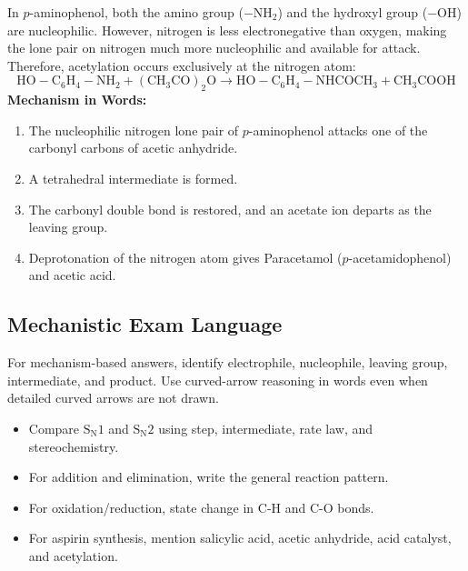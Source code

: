 \documentclass[12pt,a4paper]{article}
\begin{document}
\begin{tcolorbox}[formulabox, title={Selective Acetylation Mechanism (Chemoselectivity)}]
In $p$-aminophenol, both the amino group ($-\mathrm{NH_2}$) and the hydroxyl group ($-\mathrm{OH}$) are nucleophilic. However, nitrogen is less electronegative than oxygen, making the lone pair on nitrogen much more nucleophilic and available for attack. Therefore, acetylation occurs exclusively at the nitrogen atom:
\[
\mathrm{HO-C_6H_4-NH_2 + (CH_3CO)_2O \longrightarrow HO-C_6H_4-NHCOCH_3 + CH_3COOH}
\]
\textbf{Mechanism in Words:}
\begin{enumerate}[leftmargin=*, itemsep=2pt, topsep=1pt]
  \item The nucleophilic nitrogen lone pair of $p$-aminophenol attacks one of the carbonyl carbons of acetic anhydride.
  \item A tetrahedral intermediate is formed.
  \item The carbonyl double bond is restored, and an acetate ion departs as the leaving group.
  \item Deprotonation of the nitrogen atom gives Paracetamol ($p$-acetamidophenol) and acetic acid.
\end{enumerate}
\end{tcolorbox}

\subsection{Mechanistic Exam Language}
For mechanism-based answers, identify electrophile, nucleophile, leaving group, intermediate, and product. Use curved-arrow reasoning in words even when detailed curved arrows are not drawn.

\begin{tcolorbox}[exambox, title={Exam Points}]
\begin{itemize}[leftmargin=*, itemsep=2pt, topsep=2pt]
  \item Compare $\mathrm{S_N1}$ and $\mathrm{S_N2}$ using step, intermediate, rate law, and stereochemistry.
  \item For addition and elimination, write the general reaction pattern.
  \item For oxidation/reduction, state change in C-H and C-O bonds.
  \item For aspirin synthesis, mention salicylic acid, acetic anhydride, acid catalyst, and acetylation.
\end{itemize}
\end{tcolorbox}
\end{document}
